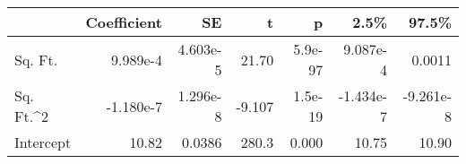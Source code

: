 \begin{tabular}{lrrrrrr}
\toprule
{} &  Coefficient &       SE &      t &       p &      2.5\% &     97.5\% \\
\midrule
Sq. Ft.   &     9.989e-4 & 4.603e-5 &  21.70 & 5.9e-97 &  9.087e-4 &    0.0011 \\
Sq. Ft.\textasciicircum 2 &    -1.180e-7 & 1.296e-8 & -9.107 & 1.5e-19 & -1.434e-7 & -9.261e-8 \\
Intercept &        10.82 &   0.0386 &  280.3 &   0.000 &     10.75 &     10.90 \\
\bottomrule
\end{tabular}
